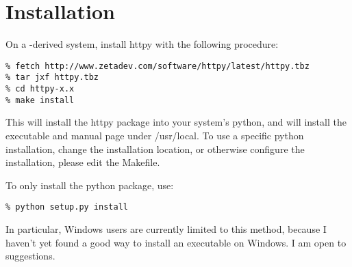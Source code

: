 \chapter{Installation}

On a \UNIX-derived system, install httpy with the following procedure:

\begin{verbatim}
% fetch http://www.zetadev.com/software/httpy/latest/httpy.tbz
% tar jxf httpy.tbz
% cd httpy-x.x
% make install
\end{verbatim}

This will install the httpy package into your system's python, and will install
the executable and manual page under /usr/local. To use a specific python
installation, change the installation location, or otherwise configure the
installation, please edit the Makefile.

To only install the python package, use:

\begin{verbatim}
% python setup.py install
\end{verbatim}

In particular, Windows users are currently limited to this method, because I
haven't yet found a good way to install an executable on Windows. I am open to
suggestions.
